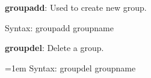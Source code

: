 \setlength{\columnsep}{3pt}
\begin{flushleft}
	
	\bigskip
	\textbf{groupadd}: Used to create new group.
	\begin{tcolorbox}[breakable,notitle,boxrule=1pt,colback=pink,colframe=pink]
		\color{black}
		Syntax:  groupadd groupname
	\end{tcolorbox}
		
	\textbf{groupdel}: Delete a group.
		\begin{tcolorbox}[breakable,notitle,boxrule=0pt,colback=pink,colframe=pink]
			\color{black}
			\font=1em
			Syntax: groupdel groupname
			\font=4pt
		\end{tcolorbox}
	
\end{flushleft}

\newpage

